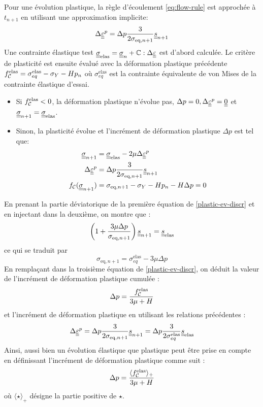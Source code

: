 \documentclass[10pt]{book}
\begin{document}
\begin{appendices}
Pour une évolution plastique, la règle d'écoulement \eqref{eq:flow-rule} est approchée à $t_{n+1}$ en utilisant une approximation implicite:
\begin{equation}
\Delta \underline{\underline{\varepsilon}}^p = \Delta p \dfrac{3}{2\sigma_{\text{eq},n+1}}\underline{\underline{s}}_{n+1}
\label{flow-rule-incr}
\end{equation}
Une contrainte élastique test $\underline{\underline{\sigma}}_{\text{elas}} = \underline{\underline{\sigma}}_{n} + \mathbb{C}:\Delta \underline{\underline{\varepsilon}}$ est d'abord calculée. Le critère de plasticité est ensuite évalué avec la déformation plastique précédente $f_{\mathcal{C}}^{\text{elas}} = \sigma_{eq}^{\text{elas}} - \sigma_{Y} - H p_n$ où $\sigma_{eq}^{\text{elas}}$ est la contrainte équivalente de von Mises de la contrainte élastique d'essai.
\begin{itemize}
\item Si $f_{\mathcal{C}}^{\text{elas}} < 0$, la déformation plastique n'évolue pas, $\Delta p=0,\Delta  \underline{\underline{\varepsilon}}^p =\underline{\underline{0}}$ et $\underline{\underline{\sigma}}_{n+1} = \underline{\underline{\sigma}}_\text{elas}$.
\item Sinon, la plasticité évolue et l'incrément de déformation plastique $\Delta p$ est tel que:
\begin{align}
\label{plastic-ev-discr}
\underline{\underline{\sigma}}_{n+1} &= \underline{\underline{\sigma}}_\text{elas} - 2\mu\Delta \underline{\underline{\varepsilon}}^p\\
\Delta \underline{\underline{\varepsilon}}^p &= \Delta p \dfrac{3}{2\sigma_{\text{eq},n+1}}\underline{\underline{s}}_{n+1}\\
f_{\mathcal{C}}(\underline{\underline{\sigma}}_{n+1}) &= \sigma_{\text{eq},n+1} - \sigma_{Y} - H p_n - H\Delta p = 0
\end{align}
\end{itemize}
En prenant la partie déviatorique de la première équation de \eqref{plastic-ev-discr} et en injectant dans la deuxième, on montre que :
$$\left(1+\dfrac{3\mu\Delta p}{\sigma_{\text{eq},n+1}}\right)\underline{\underline{s}}_{n+1} = \underline{\underline{s}}_\text{elas}$$
ce qui se traduit par
$$\sigma_{\text{eq},n+1} = \sigma_{eq}^\text{elas} - 3\mu \Delta p$$
En remplaçant dans la troisième équation de \eqref{plastic-ev-discr}, on déduit la valeur de l'incrément de déformation plastique cumulée :
$$\Delta p = \dfrac{f_{\mathcal{C}}^\text{elas}}{3\mu+H}$$
et l'incrément de déformation plastique en utilisant les relations précédentes :
$$\Delta \underline{\underline{\varepsilon}}^p = \Delta p \dfrac{3}{2\sigma_{\text{eq},n+1}}\underline{\underline{s}}_{n+1} = \Delta p \dfrac{3}{2\sigma_{eq}^\text{elas}}\underline{\underline{s}}_\text{elas}$$
Ainsi, aussi bien un évolution élastique que plastique peut être prise en compte en définissant l'incrément de déformation plastique comme suit :
\begin{equation}
\Delta p = \dfrac{\langle f_{\mathcal{C}}^\text{elas}\rangle_+}{3\mu+H}
\label{Deltap-formula}
\end{equation}
où $\langle \star \rangle_+$ désigne la partie positive de $\star$.


\end{appendices}
\end{document}
